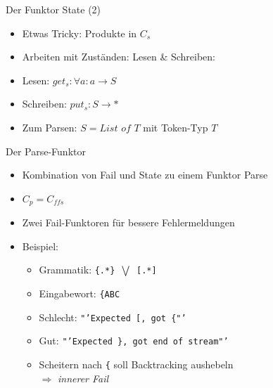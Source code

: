 \documentclass{beamer}
\begin{document}
\begin{frame}{Der Funktor State (2)}
  \begin{itemize}
  \item Etwas Tricky: Produkte in $C_{s}$
  \item Arbeiten mit Zuständen: Lesen \& Schreiben:
  \item Lesen: $get_s : \forall a : a \rightarrow S$
  \item Schreiben: $put_s : S \rightarrow *$
  \item Zum Parsen: $S = List$ $of$ $T$ mit Token-Typ $T$
  \end{itemize}
\end{frame}

\begin{frame}{Der Parse-Funktor}
  \begin{itemize}
  \item Kombination von Fail und State zu einem Funktor Parse
  \item $C_p = C_{ffs}$
  \item Zwei Fail-Funktoren für bessere Fehlermeldungen
  \item Beispiel:
    \begin{itemize}
    \item Grammatik: \texttt{\{.*\} $\bigvee$ [.*]}
    \item Eingabewort: \texttt{\{ABC}
    \item Schlecht: \texttt{"'Expected [, got \{"'}
    \item Gut: \texttt{"'Expected \}, got end of stream"'}
    \item Scheitern nach \texttt{\{} soll Backtracking aushebeln \\
      $\Rightarrow$ \textit{innerer Fail}
    \end{itemize}
  \end{itemize}
\end{frame}
\end{document}
